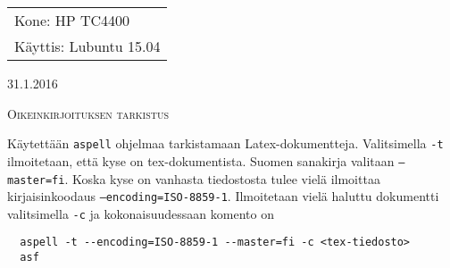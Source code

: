 \documentclass[main.tex]{subfiles}
\begin{document}
\thispagestyle{empty}
\begin{tabular}[t]{l}
Kone: HP TC4400\\
Käyttis: Lubuntu 15.04
\end{tabular}
\hfill 31.1.2016

{\scshape\Large{Oikeinkirjoituksen tarkistus}}

Käytettään \texttt{aspell} ohjelmaa tarkistamaan Latex-dokumentteja. Valitsimella \texttt{-t} ilmoitetaan, että kyse on tex-dokumentista. Suomen sanakirja valitaan \texttt{--master=fi}. Koska kyse on vanhasta tiedostosta tulee vielä ilmoittaa kirjaisinkoodaus \texttt{--encoding=ISO-8859-1}. Ilmoitetaan vielä haluttu dokumentti valitsimella \texttt{-c} ja kokonaisuudessaan komento on

\begin{lstlisting}
  aspell -t --encoding=ISO-8859-1 --master=fi -c <tex-tiedosto>
  asf
\end{lstlisting}
\end{document}
